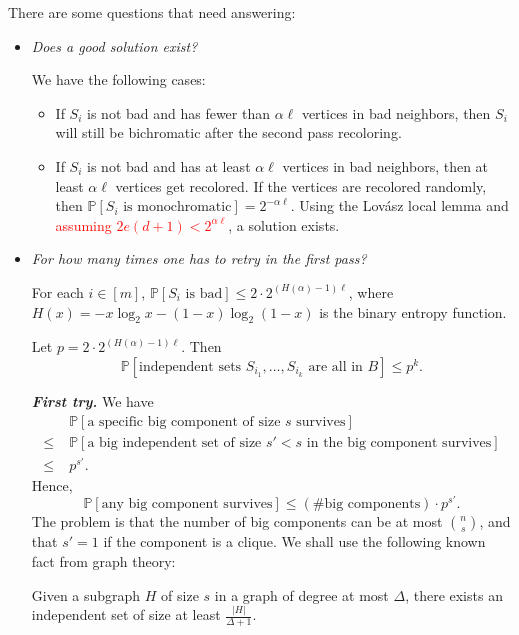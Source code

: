 \documentclass[letterpaper, reqno,11pt]{article}
\newcommand{\PP}{\mathbb{P}}
\begin{document}
There are some questions that need answering:
\begin{itemize}[itemsep=0pt]
  \item \emph{Does a good solution exist?}
  
  We have the following cases:
  \begin{itemize}[label=$\circ$, itemsep=0pt]
    \item If $S_i$ is not bad and has fewer than $\alpha \ell$ vertices in bad neighbors, then $S_i$ will still be bichromatic after the second pass recoloring.
    \item If $S_i$ is not bad and has at least $\alpha \ell$ vertices in bad neighbors, then at least $\alpha \ell$ vertices get recolored. If the vertices are recolored randomly, then $\PP[\text{$S_i$ is monochromatic}] = 2^{-\alpha \ell}$. Using the Lov\'{a}sz local lemma and \textcolor{red}{assuming $2e(d + 1) < 2^{\alpha \ell}$}, a solution exists.
  \end{itemize}
  \item \emph{For how many times one has to retry in the first pass?}
  
  \begin{fact}
    For each $i \in [m]$, $\PP[\text{$S_i$ is bad}] \leq 2 \cdot 2^{(H(\alpha) - 1) \ell}$, where $H(x) = -x\log_2 x - (1 - x) \log_2(1 - x)$ is the binary entropy function.
  \end{fact}

  Let $p = 2 \cdot 2^{(H(\alpha) - 1)\ell}$. Then
  $$ \PP\left[\text{independent sets $S_{i_1}, \ldots, S_{i_k}$ are all in $B$}\right] \leq p^k. $$

  {\bf \em First try.} We have
  \begin{align*}
    & \; \PP[\text{a specific big component of size $s$ survives}] \\
    \leq & \; \PP[\text{a big independent set of size $s' < s$ in the big component survives}] \\
    \leq & \; p^{s'}.
  \end{align*}
  Hence,
  $$ \PP[\text{any big component survives}] \leq (\text{\# big components}) \cdot p^{s'}. $$
  The problem is that the number of big components can be at most $\binom{n}{s}$, and that $s' = 1$ if the component is a clique. We shall use the following known fact from graph theory:
  
  \begin{fact}
    Given a subgraph $H$ of size $s$ in a graph of degree at most $\Delta$, there exists an independent set of size at least $\frac{|H|}{\Delta + 1}$.
  \end{fact}


\end{itemize}
\end{document}
